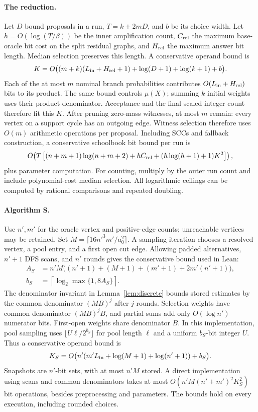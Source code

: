 \documentclass[11pt]{article}
\begin{document}
\paragraph{The reduction.}
Let $D$ bound proposals in a run, $T=k+2mD$, and $b$ be its choice width.
Let $h=O(\log(T/\beta))$ be the inner amplification count,
$C_{\rm rel}$ the maximum base-oracle bit cost on the split residual graphs,
and $H_{\rm rel}$ the maximum answer bit length. Median selection preserves
this length. A conservative operand bound is
\[
 K=O\bigl((m+k)(L_{\rm in}+H_{\rm rel}+1)
          +\log(D+1)+\log(k+1)+b\bigr).
\]
Each of the at most $m$ nominal branch probabilities contributes
$O(L_{\rm in}+H_{\rm rel})$ bits to its product. The same bound controls
$\mu(X)$; summing $k$ initial weights uses their product denominator.
Acceptance and the final scaled integer count therefore fit this $K$.
After pruning zero-mass witnesses, at most $m$ remain: every vertex on a
support cycle has an outgoing edge. Witness selection therefore uses
$O(m)$ arithmetic operations per proposal. Including SCCs and fallback
construction, a conservative schoolbook bit bound per run is
\[
 O\!\left(T\left[(n+m+1)\log(n+m+2)
       +hC_{\rm rel}+(h\log(h+1)+1)K^2\right]\right),
\]
plus parameter computation. For counting, multiply by the outer run count
and include polynomial-cost median selection. All logarithmic ceilings can
be computed by rational comparisons and repeated doubling.

\paragraph{Algorithm S.}
Use $n',m'$ for the oracle vertex and positive-edge counts; unreachable
vertices may be retained. Set $M=\lceil16n'^3m'/a_0^2\rceil$.
A sampling iteration chooses a resolved vertex, a pool entry, and a first
open cut edge. Allowing padded alternatives, $n'+1$ DFS scans, and $n'$
rounds gives the conservative bound used in Lean:
\[
 \begin{aligned}
 A_S&=n'M\bigl((n'+1)+(M+1)+(m'+1)+2m'(n'+1)\bigr),\\
 b_S&=\left\lceil\log_2\max\{1,8A_S\}\right\rceil.
 \end{aligned}
\]
The denominator invariant in Lemma~\ref{lem:discrete} bounds stored estimates
by the common denominator $(MB)^j$ after $j$ rounds. Selection weights have
common denominator $(MB)^jB$, and partial sums add only $O(\log n')$
numerator bits. First-open weights share denominator $B$. In this implementation, pool sampling
uses $\lfloor U\ell/2^{b_S}\rfloor$ for pool length $\ell$ and a uniform
$b_S$-bit integer $U$. Thus a conservative operand bound is
\[
 K_S=O\bigl(n'(m'L_{\rm in}+\log(M+1)+\log(n'+1))+b_S\bigr).
\]
Snapshots are $n'$-bit sets, with at most $n'M$ stored. A direct implementation
using scans and common denominators takes at most
$O(n'M(n'+m')^2K_S^2)$ bit operations, besides preprocessing and parameters.
The bounds hold on every execution, including rounded choices.
\end{document}
